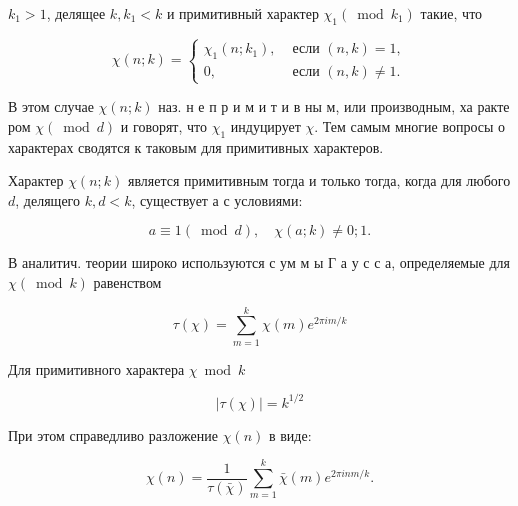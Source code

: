 \documentclass[10pt]{article}
\begin{document}
$k_{1}>1$, делящее $k, k_{1}<k$ и примитивный характер $\chi_{1}\left(\bmod k_{1}\right)$ такие, что



\[

\chi(n ; k)=\left\{\begin{array}{cl}

\chi_{1}\left(n ; k_{1}\right), & \text { если }(n, k)=1, \\

0, & \text { если }(n, k) \neq 1 .

\end{array}\right.

\]



В этом случае $\chi(n ; k)$ наз. н е п р и м и т и в ны м, или производным, ха ракте ром $\chi(\bmod d)$ и говорят, что $\chi_{1}$ индуцирует $\chi$. Тем самым многие вопросы о характерах сводятся к таковым для примитивных характеров.



Характер $\chi(n ; k)$ является примитивным тогда и только тогда, когда для любого $d$, делящего $k, d<k$, существует а с условиями:



\[

a \equiv 1(\bmod d), \quad \chi(a ; k) \neq 0 ; 1 .

\]



В аналитич. теории широко используются с ум м ы Г а у с с а, определяемые для $\chi(\bmod k)$ равенством



\[

\tau(\chi)=\sum_{m=1}^{k} \chi(m) e^{2 \pi i m / k}

\]



Для примитивного характера $\chi \bmod k$



\[

|\tau(\chi)|=k^{1 / 2}

\]



При этом справедливо разложение $\chi(n)$ в виде:



\[

\chi(n)=\frac{1}{\tau(\bar{\chi})} \sum_{m=1}^{k} \bar{\chi}(m) e^{2 \pi i n m / k} .

\]
\end{document}
